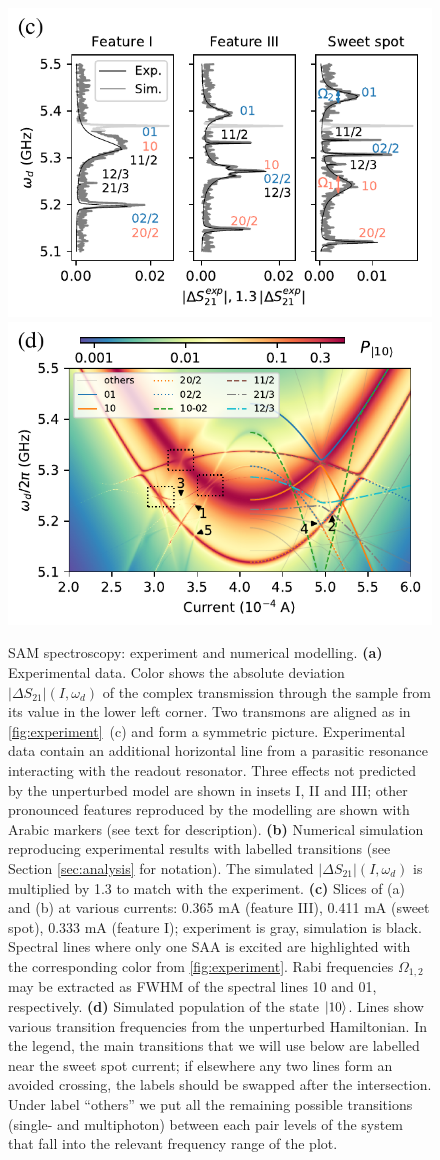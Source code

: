 \documentclass[%
 aps, prx,
 amsmath,amssymb,
 reprint,%
superscriptaddress
]{revtex4-2}
\begin{document}
\begin{figure}
	\includegraphics[width=.495\linewidth]{main_picture_slices}
	\includegraphics[width=.495\linewidth]{stationary}
	\caption{SAM spectroscopy: experiment 
	and numerical modelling. \textbf{(a)} 
	Experimental data. Color shows the absolute deviation $|\Delta S_{21}| (I, \omega_d)$ of the complex transmission through the sample from its value in the lower left corner. 
	Two transmons are aligned as in 
	\autoref{fig:experiment}~(c) and form a 
	symmetric picture. Experimental data contain 
	an additional horizontal line from a 
	parasitic resonance interacting with the 
	readout resonator. Three effects
	not predicted by the unperturbed model are 
	shown in insets I, II and III; other 
	pronounced features reproduced by the 
	modelling are shown with Arabic markers (see 
	text for description). \textbf{(b)} Numerical 
	simulation reproducing experimental results 
	with labelled transitions (see Section 
	\ref{sec:analysis} for notation). The simulated $|\Delta S_{21}| (I, \omega_d)$ is multiplied by 1.3 to match with the experiment.
	\textbf{(c)} Slices of (a) and (b) at various 
	currents: 0.365 mA (feature III), 0.411 mA 
	(sweet spot), 0.333 mA (feature I); 
	experiment is gray, simulation is black. 
	Spectral lines where only one SAA is excited 
	are highlighted with the corresponding color 
	from \autoref{fig:experiment}. Rabi 
	frequencies $\Omega_{1,2}$ may be extracted 
	as FWHM of the spectral lines 10 and 01, 
	respectively. \textbf{(d)} Simulated 
	population of the state $\ket{10}$. Lines 
	show various transition frequencies from the 
	unperturbed Hamiltonian. In the legend, the main
	transitions that we will use below are labelled near the sweet spot current; if 
	elsewhere any two lines form an avoided 
	crossing, the labels should be swapped after 
	the intersection. Under label ``others'' we put all the remaining possible transitions (single- and multiphoton) between each pair levels of the system that fall into the relevant frequency range of the plot.}
	\label{fig:two-tone}
\end{figure}
\end{document}
